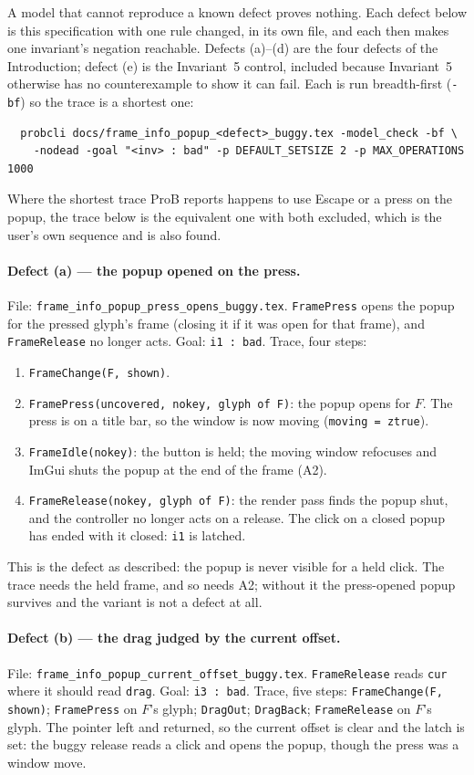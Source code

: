 \documentclass[a4paper,10pt,fleqn]{article}
\begin{document}
A model that cannot reproduce a known defect proves nothing.  Each defect below
is this specification with one rule changed, in its own file, and each then
makes one invariant's negation reachable.  Defects (a)--(d) are the four defects
of the Introduction; defect (e) is the Invariant~5 control, included because
Invariant~5 otherwise has no counterexample to show it can fail.  Each is run
breadth-first (\texttt{-bf}) so the trace is a shortest one:
\begin{verbatim}
  probcli docs/frame_info_popup_<defect>_buggy.tex -model_check -bf \
    -nodead -goal "<inv> : bad" -p DEFAULT_SETSIZE 2 -p MAX_OPERATIONS 1000
\end{verbatim}
Where the shortest trace ProB reports happens to use Escape or a press on the
popup, the trace below is the equivalent one with both excluded, which is the
user's own sequence and is also found.

\paragraph{Defect (a) --- the popup opened on the press.}
File: \texttt{frame\_info\_popup\_press\_opens\_buggy.tex}.  \texttt{FramePress}
opens the popup for the pressed glyph's frame (closing it if it was open for
that frame), and \texttt{FrameRelease} no longer acts.  Goal: \texttt{i1 : bad}.
Trace, four steps:
\begin{enumerate}
  \item \texttt{FrameChange(F, shown)}.
  \item \texttt{FramePress(uncovered, nokey, glyph of F)}: the popup opens for
    $F$.  The press is on a title bar, so the window is now moving
    (\texttt{moving = ztrue}).
  \item \texttt{FrameIdle(nokey)}: the button is held; the moving window
    refocuses and ImGui shuts the popup at the end of the frame (A2).
  \item \texttt{FrameRelease(nokey, glyph of F)}: the render pass finds the
    popup shut, and the controller no longer acts on a release.  The click on a
    closed popup has ended with it closed: \texttt{i1} is latched.
\end{enumerate}
This is the defect as described: the popup is never visible for a held click.
The trace needs the held frame, and so needs A2; without it the press-opened
popup survives and the variant is not a defect at all.

\paragraph{Defect (b) --- the drag judged by the current offset.}
File: \texttt{frame\_info\_popup\_current\_offset\_buggy.tex}.
\texttt{FrameRelease} reads \texttt{cur} where it should read \texttt{drag}.
Goal: \texttt{i3 : bad}.  Trace, five steps: \texttt{FrameChange(F, shown)};
\texttt{FramePress} on $F$'s glyph; \texttt{DragOut}; \texttt{DragBack};
\texttt{FrameRelease} on $F$'s glyph.  The pointer left and returned, so the
current offset is clear and the latch is set: the buggy release reads a click
and opens the popup, though the press was a window move.
\end{document}

